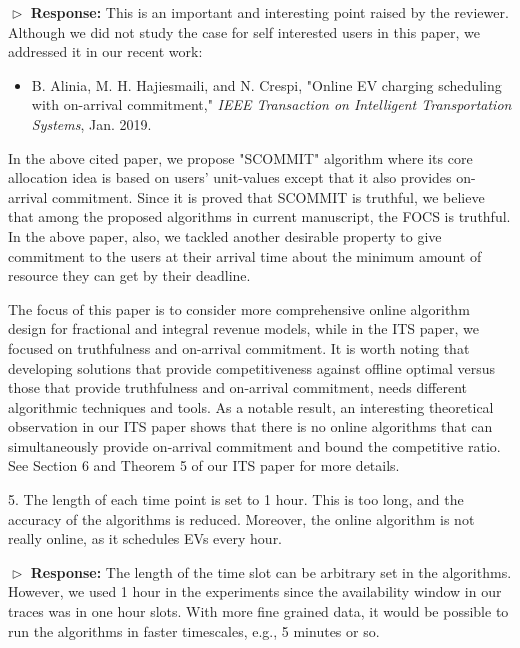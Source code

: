 \documentclass[11pt]{article}
\begin{document}
$\vartriangleright$ \noindent\textbf{Response:} 
This is an important and interesting point raised by the reviewer. Although we did not study the case for self interested users in this paper, we addressed it in our recent work: 

\begin{itemize}
\item B. Alinia, M. H. Hajiesmaili, and N. Crespi, "Online EV charging scheduling with on-arrival commitment," \textit{IEEE Transaction on Intelligent Transportation Systems}, Jan. 2019.
\end{itemize}


In the above cited paper, we propose "SCOMMIT" algorithm where its core allocation idea is based on users' unit-values except that it also provides on-arrival commitment. Since it is proved that SCOMMIT is truthful, we believe that among the proposed algorithms in current manuscript, the FOCS is truthful. In the above paper, also, we tackled another desirable property to give commitment to the users at their arrival time about the minimum amount of resource they can get by their deadline. 

The focus of this paper is to consider more comprehensive online algorithm design for fractional and integral revenue models, while in the ITS paper, we focused on truthfulness and on-arrival commitment. It is worth noting that developing solutions that provide competitiveness against offline optimal versus those that provide truthfulness and on-arrival commitment, needs different algorithmic techniques and tools. As a notable result, an interesting theoretical observation in our ITS paper shows that there is no online algorithms that can simultaneously provide on-arrival commitment and bound the competitive ratio. See Section 6 and Theorem 5 of our ITS paper for more details. 

\vspace{3mm}
{\color{blue} 5. The length of each time point is set to 1 hour. This is too long, and the accuracy of the algorithms is reduced. Moreover, the online algorithm is not really online, as it schedules EVs every hour. }
\vspace{3mm}

$\vartriangleright$ \noindent\textbf{Response:} 
The length of the time slot can be arbitrary set in the algorithms. However, we used 1 hour in the experiments since the availability window in our traces was in one hour slots. With more fine grained data, it would be possible to run the algorithms in faster timescales, e.g., 5 minutes or so. 
\end{document}
